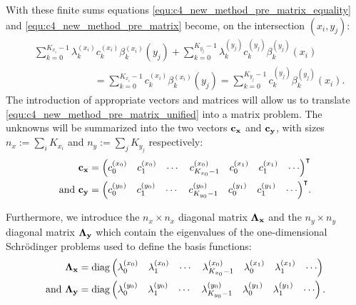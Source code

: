 With these finite sums equations \eqref{equ:c4_new_method_pre_matrix_equality} and \eqref{equ:c4_new_method_pre_matrix} become, on the intersection $(x_i, y_j)$:
\begin{align}
     & \sum_{k=0}^{K_{x_i}-1} \lambda_k^{(x_i)} c_k^{(x_i)} \beta^{(x_i)}_k(y_j) + \sum_{k=0}^{K_{y_j}-1} \lambda_k^{(y_j)} c_k^{(y_j)} \beta_k^{(y_j)}(x_i)\nonumber                                  \\
     & \qquad\qquad\qquad     = \sum_{k=0}^{K_{x_i}-1} c_k^{(x_i)} \beta_k^{(x_i)}(y_j) = \sum_{k=0}^{K_{y_j}-1} c_k^{(y_j)} \beta_k^{(y_j)}(x_i) \text{.}\label{equ:c4_new_method_pre_matrix_unified}
\end{align}
The introduction of appropriate vectors and matrices will allow us to translate \eqref{equ:c4_new_method_pre_matrix_unified} into a matrix problem. The unknowns will be summarized into the two vectors $\vb{c_x}$ and $\vb{c_y}$, with sizes $n_x := \sum_i K_{x_i}$ and $n_y := \sum_j K_{y_j}$ respectively:
\begin{align*}
    \vb{c_x}            & = {\begin{pmatrix} c_0^{(x_0)} & c_1^{(x_0)} & \cdots & c_{K_{x_0}-1}^{(x_0)} & c_0^{(x_1)} & c_1^{(x_1)} & \cdots \end{pmatrix}}^\intercal         \\
    \text{and }\vb{c_y} & = {\begin{pmatrix} c_0^{(y_0)} & c_1^{(y_0)} & \cdots & c_{K_{y_0}-1}^{(y_0)} & c_0^{(y_1)} & c_1^{(y_1)} & \cdots \end{pmatrix}}^\intercal\text{.}
\end{align*}

Furthermore, we introduce the $n_x \times n_x$ diagonal matrix $\vb{\Lambda_x}$ and the $n_y \times n_y$ diagonal matrix $\vb{\Lambda_y}$ which contain the eigenvalues of the one-dimensional Schrödinger problems used to define the basis functions:
\begin{align*}
    \vb{\Lambda_x}            & = \operatorname{diag}\begin{pmatrix} \lambda_0^{(x_0)} & \lambda_1^{(x_0)} & \cdots & \lambda_{K_{x_0}-1}^{(x_0)} & \lambda_0^{(x_1)} & \lambda_1^{(x_1)} & \cdots \end{pmatrix}         \\
    \text{and }\vb{\Lambda_y} & = \operatorname{diag}\begin{pmatrix} \lambda_0^{(y_0)} & \lambda_1^{(y_0)} & \cdots & \lambda_{K_{y_0}-1}^{(y_0)} & \lambda_0^{(y_1)} & \lambda_1^{(y_1)} & \cdots \end{pmatrix}\text{.} \\
\end{align*}

